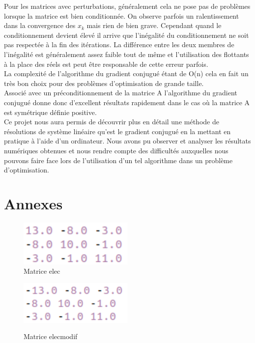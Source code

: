 \documentclass[12,french]{report}
\begin{document}
Pour les matrices avec perturbations, généralement cela ne pose pas de problèmes lorsque la matrice est bien conditionnée. On observe parfois un ralentissement dans la convergence des $x_{k}$ mais rien de bien grave. Cependant quand le conditionnement devient élevé il arrive que l'inégalité du conditionnement ne soit pas respectée à la fin des itérations. La différence entre les deux membres de l'inégalité est généralement assez faible tout de même et l'utilisation des flottants à la place des réels est peut être responsable de cette erreur parfois.\\

La complexité de l'algorithme du gradient conjugué étant de O(n) cela en fait un très bon choix pour des problèmes d'optimisation de grande taille.\\
Associé avec un préconditionnement de la matrice A l'algorithme du gradient conjugué donne donc d'excellent résultats rapidement dans le cas où la matrice A est symétrique définie positive. \\

Ce projet nous aura permis de découvrir plus en détail une méthode de résolutions de système linéaire qu'est le gradient conjugué en la mettant en pratique à l'aide d'un ordinateur. Nous avons pu observer et analyser les résultats numériques obtenues et nous rendre compte des difficultés auxquelles nous pouvons faire face lors de l'utilisation d'un tel algorithme dans un problème d'optimisation.

\chapter*{Annexes}
\begin{figure}[H]
    \begin{minipage}[c]{.46\linewidth}
        \centering
        \includegraphics[width=0.5\textwidth]{./Images/elec}\\
        \caption*{Matrice elec}
    \end{minipage}
    \hfill%
    \begin{minipage}[c]{.46\linewidth}
        \centering
        \includegraphics[width=0.5\textwidth]{./Images/elecmodif}\\
        \caption*{Matrice elecmodif}
    \end{minipage}
\end{figure}%
\end{document}
